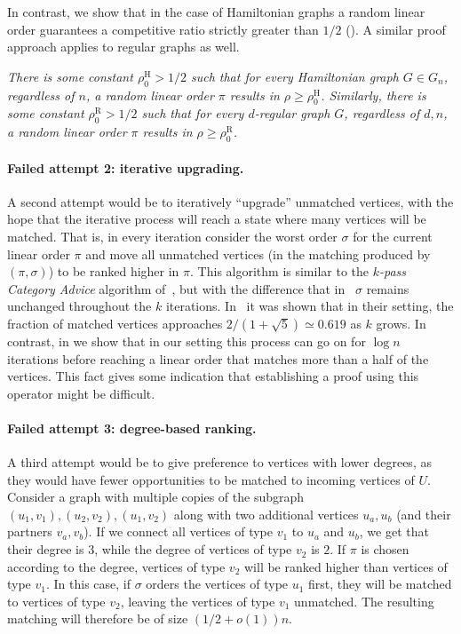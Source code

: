 \documentclass{toc}
\theoremstyle{plain}
\begin{document}
In contrast, we show that in the case of Hamiltonian graphs a random linear order guarantees a competitive ratio strictly greater than $1/2$ ().
A similar proof approach applies to regular graphs as well.

\vspace{0.1in}
%
%
\emph{There is some constant $\rho_0^{\mathrm{H}} > 1/2$ such that for every Hamiltonian graph $G \in G_n$, regardless of $n$,
a random linear order $\pi$ results in $\rho \geq \rho_0^{\mathrm{H}}$.
Similarly, there is some constant $\rho_0^{\mathrm{R}} > 1/2$ such that for every $d$-regular graph $G$, regardless of $d,n$, a random linear order $\pi$ results in $\rho \geq \rho_0^{\mathrm{R}}$.}
\vspace{0.1in}

\paragraph*{Failed attempt 2: iterative upgrading.}
A second attempt would be to iteratively ``upgrade'' unmatched vertices, with the hope that the iterative process will reach a state where many vertices will be matched.
That is, in every iteration consider the worst order $\sigma$ for the current linear order $\pi$ and move all unmatched vertices (in the matching
%
produced %
by $(\pi,\sigma)$) to be ranked higher in $\pi$. This algorithm is similar to the \emph{$k$-pass Category Advice} algorithm of~\cite{Bor2017}, but with the difference that in~\cite{Bor2017} $\sigma$ remains unchanged throughout the $k$ iterations. In~\cite{Bor2017} it was shown that in their setting, the fraction of matched vertices approaches $2/(1 + \sqrt{5}) \simeq 0.619$ as $k$ grows. In contrast,
in  we show that in our setting this process can go on for $\log n$ iterations before reaching a linear order that matches more than a half of the vertices.
This fact gives some indication that establishing a proof using this operator might be difficult.

\paragraph*{Failed attempt 3: degree-based ranking.}
A third attempt would be to give preference to vertices with lower degrees, as they would have fewer opportunities to be matched to incoming vertices of $U$. %
Consider a graph with multiple copies of the subgraph $(u_1,v_1),(u_2,v_2),(u_1,v_2)$ along with two additional vertices $u_a,u_b$ (and their partners $v_a,v_b$). If we connect all vertices of type $v_1$ to $u_a$ and $u_b$, we get that their degree is $3$, while the degree of vertices of type $v_2$ is $2$. If $\pi$ is chosen according to the degree, vertices of type $v_2$ will be ranked higher than vertices of type $v_1$. In this case, if $\sigma$ orders the vertices of type $u_1$ first, they will be matched to vertices of type $v_2$, leaving the vertices of type $v_1$ unmatched. The resulting matching will therefore be of size $(1/2+o(1))n$.
\end{document}
